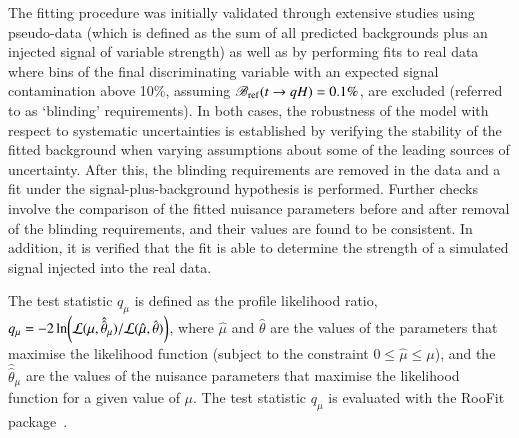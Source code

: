 The fitting procedure was initially validated through extensive studies using pseudo-data (which is defined as the sum of all predicted backgrounds 
plus an injected signal of variable strength) as well as by performing fits to real data where bins of the final discriminating variable with 
an expected signal contamination above 10\%, assuming $\mathscr{B}_{\mathrm{ref}}(t\rightarrow qH)=0.1\%$, are excluded (referred to as `blinding' requirements).
In both cases, the robustness of the model with respect to systematic uncertainties is established by verifying the stability of the fitted background 
when varying assumptions about some of the leading sources of uncertainty. 
After this, the blinding requirements
are removed in the data and a fit under the signal-plus-background hypothesis is performed. Further checks involve the comparison of the fitted 
nuisance parameters before and after removal of the blinding requirements, and their values are found to be consistent. In addition, it is verified that the 
fit is able to determine the strength of a simulated signal injected into the real data.

The test statistic $q_\mu$ is defined as the profile likelihood ratio, 
$q_\mu = -2\ln({\cal L}(\mu,{\hat{\hat{\theta}}}_\mu)/{\cal L}(\hat{\mu},\hat{\theta}))$,
where $\hat{\mu}$ and $\hat{\theta}$ are the values of the parameters that
maximise the likelihood function (subject to the constraint $0\leq \hat{\mu} \leq \mu$), and the ${\hat{\hat{\theta}}}_\mu$ are the values of the
nuisance parameters that maximise the likelihood function for a given value of $\mu$. 
The test statistic $q_\mu$ is evaluated with the {\textsc RooFit} package~\cite{Verkerke:2003ir,RooFitManual}.

